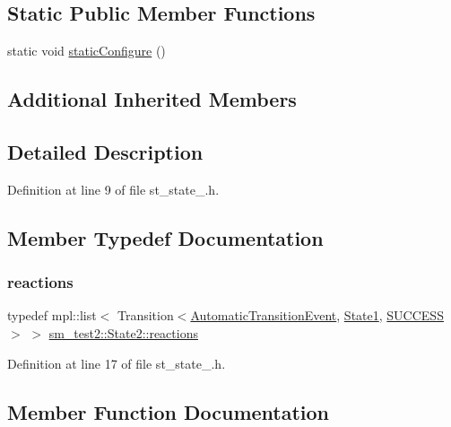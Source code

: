 \subsection*{Static Public Member Functions}
\begin{DoxyCompactItemize}
\item 
static void \hyperlink{structsm__test2_1_1State2_a0bbdc8382042af7edd85a3c048ad7c7c}{static\+Configure} ()
\end{DoxyCompactItemize}
\subsection*{Additional Inherited Members}


\subsection{Detailed Description}


Definition at line 9 of file st\+\_\+state\+\_.\+h.



\subsection{Member Typedef Documentation}
\mbox{\label{structsm__test2_1_1State2_ac0be669416dfba18151af79b1eb2b1de}} 
\subsubsection{\texorpdfstring{reactions}{reactions}}
{\footnotesize\ttfamily typedef mpl\+::list$<$ Transition$<$\hyperlink{structsm__test2_1_1AutomaticTransitionEvent}{Automatic\+Transition\+Event}, \hyperlink{structsm__test2_1_1State1}{State1}, \hyperlink{classSUCCESS}{S\+U\+C\+C\+E\+SS}$>$ $>$ \hyperlink{structsm__test2_1_1State2_ac0be669416dfba18151af79b1eb2b1de}{sm\+\_\+test2\+::\+State2\+::reactions}}



Definition at line 17 of file st\+\_\+state\+\_.\+h.



\subsection{Member Function Documentation}
\mbox{\label{structsm__test2_1_1State2_aac555da5724e95296482d06026bbca88}} 
